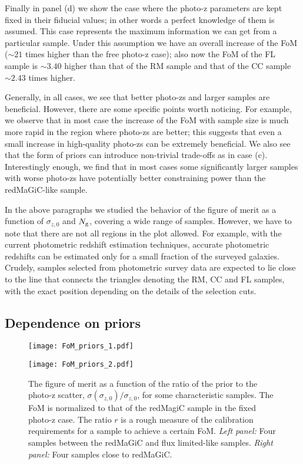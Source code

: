 \documentclass[a4paper,fleqn,usenatbib]{mnras}
\begin{document}
Finally in panel (d) we show the case where the photo-z parameters are kept fixed in their fiducial values; in other words a perfect knowledge of them is assumed. This case represents the maximum information we can get from a particular sample. Under this assumption we have an overall increase of the FoM ($\sim 21$ times higher than the free photo-z case); also now the FoM of the FL sample is $\sim 3.40$ higher than that of the RM sample and that of the CC sample $\sim 2.43$ times higher.

Generally, in all cases, we see that better photo-zs and larger samples are beneficial. However, there are some specific points worth noticing. For example, we observe that in most case the increase of the FoM with sample size is much more rapid in the region where photo-zs are better; this suggests that even a small increase in high-quality photo-zs can be extremely beneficial. We also see that the form of priors can introduce non-trivial trade-offs as in case (c). Interestingly enough, we find that in most cases some significantly larger samples with worse photo-zs have potentially better constraining power than the redMaGiC-like sample.

In the above paragraphs we studied the behavior of the figure of merit as a function of $\sigma_{z,0}$ and $N_{\mbox{\scriptsize{g}}}$, covering a wide range of samples. However, we have to note that there are not all regions in the plot allowed. For example, with the current photometric redshift estimation techniques,  accurate photometric redshifts can be estimated only for a small fraction  of the surveyed galaxies. Crudely, samples selected from photometric survey data are expected to lie close to the line that connects the triangles denoting the RM, CC and FL samples, with the exact position depending on the details of the selection cuts. 


\subsection{Dependence on priors}
\label{subsec: Depend_on_priors}

\begin{figure*}
\centering
\begin{multicols}{2}
\texttt{[image: FoM\_priors\_1.pdf]}\par 
\texttt{[image: FoM\_priors\_2.pdf]}\par 
\end{multicols}
\caption{The figure of merit as a function of the ratio of the prior to the photo-z scatter, $\sigma(\sigma_{z,0})/\sigma_{z,0}$, for some characteristic samples. The FoM is normalized to that of the redMagiC sample in the fixed photo-z case. The ratio $r$ is a rough measure of the calibration requirements for a sample to achieve a certain FoM. \textit{Left panel:} Four samples between the redMaGiC and flux limited-like samples. \textit{Right panel:} Four samples close to redMaGiC.}
\label{fig: Priors_baseline}
\end{figure*}
\end{document}
